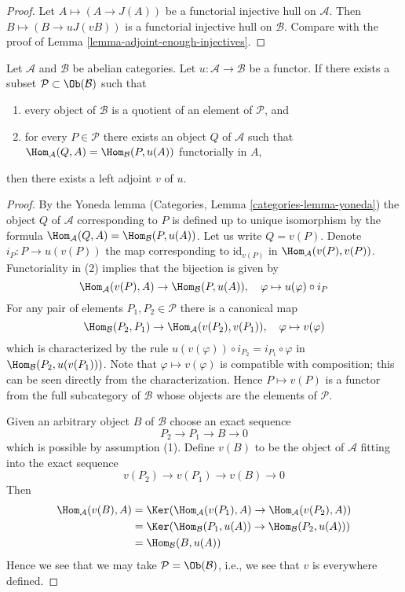 \begin{proof}
Let $A \mapsto (A \to J(A))$ be a functorial
injective hull on $\mathcal{A}$. Then
$B \mapsto (B \to uJ(vB))$ is a functorial
injective hull on $\mathcal{B}$. Compare with the
proof of Lemma \ref{lemma-adjoint-enough-injectives}.
\end{proof}

\begin{lemma}
\label{lemma-partially-defined-adjoint}
Let $\mathcal{A}$ and $\mathcal{B}$ be abelian categories.
Let $u : \mathcal{A} \to \mathcal{B}$ be a functor.
If there exists a subset $\mathcal{P} \subset \Ob(\mathcal{B})$
such that
\begin{enumerate}
\item every object of $\mathcal{B}$ is a quotient of an element
of $\mathcal{P}$, and
\item for every $P \in \mathcal{P}$ there exists an object
$Q$ of $\mathcal{A}$ such that
$\Hom_\mathcal{A}(Q, A) = \Hom_\mathcal{B}(P, u(A))$ functorially
in $A$,
\end{enumerate}
then there exists a left adjoint $v$ of $u$.
\end{lemma}

\begin{proof}
By the Yoneda lemma (Categories, Lemma \ref{categories-lemma-yoneda})
the object $Q$ of $\mathcal{A}$ corresponding to $P$ is defined up to
unique isomorphism by the formula
$\Hom_\mathcal{A}(Q, A) = \Hom_\mathcal{B}(P, u(A))$. Let us write
$Q = v(P)$. Denote $i_P : P \to u(v(P))$ the map corresponding to
$\text{id}_{v(P)}$ in $\Hom_\mathcal{A}(v(P), v(P))$. Functoriality
in (2) implies that the bijection is given by
$$
\Hom_\mathcal{A}(v(P), A) \to \Hom_\mathcal{B}(P, u(A)),\quad
\varphi \mapsto u(\varphi) \circ i_P
$$
For any pair of elements $P_1, P_2 \in \mathcal{P}$ there is a canonical map
$$
\Hom_\mathcal{B}(P_2, P_1)
\to
\Hom_\mathcal{A}(v(P_2), v(P_1)),\quad
\varphi \mapsto v(\varphi)
$$
which is characterized by the rule
$u(v(\varphi)) \circ i_{P_2} = i_{P_1} \circ \varphi$ in
$\Hom_\mathcal{B}(P_2, u(v(P_1)))$.
Note that $\varphi \mapsto v(\varphi)$ is
compatible with composition; this can be seen directly
from the characterization. Hence $P \mapsto v(P)$ is a functor from
the full subcategory of $\mathcal{B}$ whose objects are the elements
of $\mathcal{P}$.

\medskip\noindent
Given an arbitrary object $B$ of $\mathcal{B}$ choose an exact sequence
$$
P_2 \to P_1 \to B \to 0
$$
which is possible by assumption (1). Define $v(B)$ to be the object of
$\mathcal{A}$ fitting into the exact sequence
$$
v(P_2) \to v(P_1) \to v(B) \to 0
$$
Then
\begin{align*}
\Hom_\mathcal{A}(v(B), A)
& =
\Ker(\Hom_\mathcal{A}(v(P_1), A) \to \Hom_\mathcal{A}(v(P_2), A)) \\
& =
\Ker(\Hom_\mathcal{B}(P_1, u(A)) \to \Hom_\mathcal{B}(P_2, u(A))) \\
& =
\Hom_\mathcal{B}(B, u(A))
\end{align*}
Hence we see that we may take $\mathcal{P} = \Ob(\mathcal{B})$, i.e., we
see that $v$ is everywhere defined.
\end{proof}




